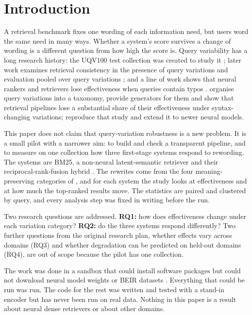 \documentclass[
  11pt,
]{article}
\begin{document}
\hypertarget{introduction}{%
\section{Introduction}\label{introduction}}

A retrieval benchmark fixes one wording of each information need, but
users word the same need in many ways. Whether a system's score survives
a change of wording is a different question from how high the score is.
Query variability has a long research history: the UQV100 test
collection was created to study it \citep{bailey2016}; later work
examines retrieval consistency in the presence of query variations
\citep{bailey2017} and evaluation pooled over query variations
\citep{moffat2015}; and a line of work shows that neural rankers and
retrievers lose effectiveness when queries contain typos
\citep{zhuang2021, zhuang2022, sidiropoulos2022, tasawong2023}.
\citet{penha2022} organise query variations into a taxonomy, provide
generators for them and show that retrieval pipelines lose a substantial
share of their effectiveness under syntax-changing variations;
\citet{hagen2024} reproduce that study and extend it to newer neural
models.

This paper does not claim that query-variation robustness is a new
problem. It is a small pilot with a narrower aim: to build and check a
transparent pipeline, and to measure on one collection how three
first-stage systems respond to rewording. The systems are BM25, a
non-neural latent-semantic retriever and their reciprocal-rank-fusion
hybrid \citep{cormack2009}. The rewrites come from the four
meaning-preserving categories of \citet{penha2022}, and for each system
the study looks at effectiveness and at how much the top-ranked results
move. The statistics are paired and clustered by query, and every
analysis step was fixed in writing before the run.

Two research questions are addressed. \textbf{RQ1:} how does
effectiveness change under each variation category? \textbf{RQ2:} do the
three systems respond differently? Two further questions from the
original research plan, whether effects vary across domains (RQ3) and
whether degradation can be predicted on held-out domains (RQ4), are out
of scope because the pilot has one collection.

The work was done in a sandbox that could install software packages but
could not download neural model weights or BEIR datasets
\citep{thakur2021}. Everything that could be run was run. The code for
the rest was written and tested with a stand-in encoder but has never
been run on real data. Nothing in this paper is a result about neural
dense retrievers or about other domains.
\end{document}
